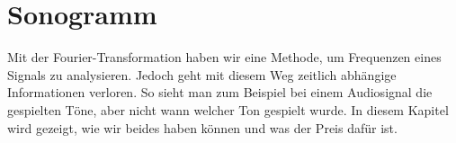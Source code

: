 %
%
%
%
\chapter{Sonogramm\label{chapter:sonogramm}}
\begin{refsection}

Mit der Fourier-Transformation haben wir eine Methode, um Frequenzen eines
Signals zu analysieren.
Jedoch geht mit diesem Weg zeitlich abhängige Informationen verloren.
So sieht man zum Beispiel bei einem Audiosignal die gespielten Töne,
aber nicht wann welcher Ton gespielt wurde.
In diesem Kapitel wird gezeigt, wie wir beides haben können und was der
Preis dafür ist.







\printbibliography[heading=subbibliography]
\end{refsection}
